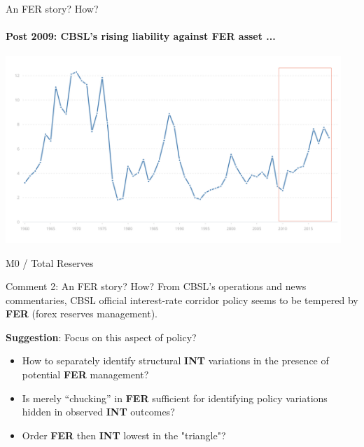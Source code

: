 \documentclass[10pt,english,slidetop,compress,
              blue,mathserif,color=option]{beamer}
\theoremstyle{plain}
\theoremstyle{definition}
\begin{document}
\begin{frame}{An FER story? How?}
  \framesubtitle{Post 2009: CBSL's rising liability against FER asset ...}
  \includegraphics[width=0.95\textwidth]{figures/M0-to-totalreserves.png} 
  \begin{center}
    M0 / Total Reserves
  \end{center}
\end{frame}

\begin{frame}{Comment 2: An FER story? How?}
  From CBSL's operations and news commentaries, CBSL official interest-rate corridor policy seems to be tempered by \textbf{FER} (forex reserves management).

  \bigskip

  \textbf{Suggestion}: Focus on this aspect of policy?
    \begin{itemize}
      \item How to separately identify structural \textbf{INT} variations in the presence of potential \textbf{FER} management?
      \item Is merely ``chucking'' in \textbf{FER} sufficient for identifying policy variations hidden in observed \textbf{INT} outcomes?
      \item Order \textbf{FER} then \textbf{INT} lowest in the "triangle"?
    \end{itemize}
\end{frame}
\end{document}
